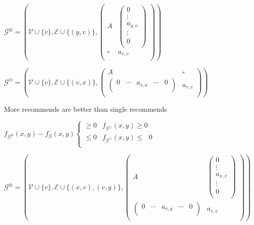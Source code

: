 \documentclass{article}
\begin{document}
\(\mathcal{G}^{\oplus }=\left(\mathcal{V}\cup \{v\},\mathcal{E}\cup \{(y,v)\},\left(
\begin{array}{cc}
 A & \left(
\begin{array}{c}
 0 \\
 \vdots \\
a_{y,v} \\
 \vdots \\
0 \\
\end{array}
\right) \\
 \square  & a_{v,v} \\
\end{array}
\right)\right)\)

\(\mathcal{G}^{\ominus }=\left(\mathcal{V}\cup \{v\},\mathcal{E}\cup \{(v,x)\},\left(
\begin{array}{cc}
 A & \square  \\
 \left(
\begin{array}{ccccc}
 0 & \cdots  & a_{v,x} & \cdots  & 0 \\
\end{array}
\right) & a_{v,v} \\
\end{array}
\right)\right)\)

More recommends are better than single recommends

\(f_{\mathcal{G}^{\otimes }}(x,y)-f_{\mathcal{G}}(x,y)\left\{
\begin{array}{cc}
 \geq 0 & f_{\mathcal{G}^{\odot }}(x,y)\geq  0 \\
 \leq 0 & f_{\mathcal{G}^{\odot }}(x,y)\leq \text{  }0 \\
\end{array}
\right.\)

\(\mathcal{G}^{\otimes }=\left(\mathcal{V}\cup \{v\},\mathcal{E}\cup \{(x,v),(v,y)\},\left(
\begin{array}{cc}
 A & \left(
\begin{array}{c}
 0 \\
 \vdots \\
a_{x,v} \\
 \vdots \\
0 \\
\end{array}
\right) \\
 \left(
\begin{array}{ccccc}
 0 & \cdots  & a_{v,y} & \cdots  & 0 \\
\end{array}
\right) & a_{v,v} \\
\end{array}
\right)\right)\)
\end{document}
